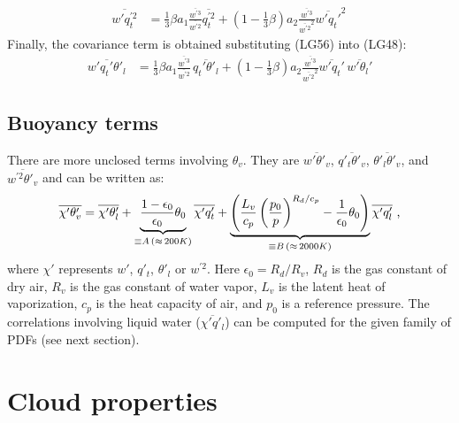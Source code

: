 \documentclass[11pt,fleqn]{article}
\begin{document}
%
\begin{equation}
\label{eq_wpqtp2}
\begin{split}
\overline{w'q_t^{'2}}
& = 
    \frac{1}{3} \beta
    a_1 \frac{\overline{w^{'3}}}{\overline{w^{'2}}} \overline{q_t^{'2}}
  + \left( 1 - \frac{1}{3}\beta \right)
    a_2 \frac{\overline{w^{'3}}}{\overline{w^{'2}}^2} \overline{w'q_t'}^2 \,
\end{split}
\end{equation}
%
Finally, the covariance term is obtained substituting (LG56) into (LG48):
%
\begin{equation}
\label{eq_wpqtpthlp}
\begin{split}
\overline{w'q_t'\theta'_l}
& =
    \frac{1}{3} \beta
    a_1 \frac{\overline{w^{'3}}}{\overline{w^{'2}}} \,
    \overline{q_t'\theta'_l}
  + \left( 1 - \frac{1}{3}\beta \right)
    a_2 \frac{\overline{w^{'3}}}{\overline{w^{'2}}^2}
    \overline{w'q_t'} \, \overline{w'\theta_l'}
\end{split}
\end{equation}
%

\subsection{Buoyancy terms}

There are more unclosed terms involving $\theta_v$. They are
$\overline{w'\theta'_v}$, $\overline{q'_t\theta'_v}$,
$\overline{\theta'_l\theta'_v}$, and $\overline{w^{'2}\theta'_v}$ and can be
written as:
%
\begin{equation}
\overline{\chi'\theta'_v} 
= \overline{\chi'\theta'_l} 
+ \underbrace{ \frac{1-\epsilon_0}{\epsilon_0} \theta_0 
             }_{\equiv A \, (\approx \, 200 K)}
  \overline{\chi'q'_t}
+ \underbrace{
   \left( 
     \frac{L_v}{c_p} \left( \frac{p_0}{p} \right)^{R_d/c_p}      
     - \frac{1}{\epsilon_0}\theta_0
   \right) }_{\equiv B \, (\approx \, 2000 K)}
  \overline{\chi'q'_l} \hbox{ ,}
\end{equation}
% 
where $\chi'$ represents $w'$, $q'_t$, $\theta'_l$ or $w^{'2}$.
Here $\epsilon_0 = R_d/R_v$, $R_d$ is the gas constant of dry air, 
$R_v$ is the gas constant of water vapor, $L_v$ is the latent heat 
of vaporization, $c_p$ is the heat capacity of air, 
and $p_0$ is a reference pressure. The correlations involving
liquid water ($\overline{\chi'q'_l}$) can be computed for the given
family of PDFs (see next section).

\section{Cloud properties}
\end{document}
